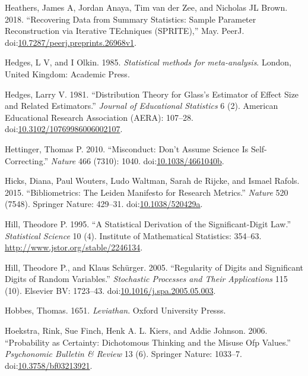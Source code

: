 \documentclass[a5paper]{book}
\begin{document}
\hypertarget{ref-doi:10.7287ux2fpeerj.preprints.26968v1}{}
Heathers, James A, Jordan Anaya, Tim van der Zee, and Nicholas JL Brown.
2018. ``Recovering Data from Summary Statistics: Sample Parameter
Reconstruction via Iterative TEchniques (SPRITE),'' May. PeerJ.
doi:\href{https://doi.org/10.7287/peerj.preprints.26968v1}{10.7287/peerj.preprints.26968v1}.

\hypertarget{ref-Hedges1985-dy}{}
Hedges, L V, and I Olkin. 1985. \emph{Statistical methods for
meta-analysis}. London, United Kingdom: Academic Press.

\hypertarget{ref-doi:10.3102ux2f10769986006002107}{}
Hedges, Larry V. 1981. ``Distribution Theory for Glass's Estimator of
Effect Size and Related Estimators.'' \emph{Journal of Educational
Statistics} 6 (2). American Educational Research Association (AERA):
107--28.
doi:\href{https://doi.org/10.3102/10769986006002107}{10.3102/10769986006002107}.

\hypertarget{ref-doi:10.1038ux2f4661040b}{}
Hettinger, Thomas P. 2010. ``Misconduct: Don't Assume Science Is
Self-Correcting.'' \emph{Nature} 466 (7310): 1040.
doi:\href{https://doi.org/10.1038/4661040b}{10.1038/4661040b}.

\hypertarget{ref-doi:10.1038ux2f520429a}{}
Hicks, Diana, Paul Wouters, Ludo Waltman, Sarah de Rijcke, and Ismael
Rafols. 2015. ``Bibliometrics: The Leiden Manifesto for Research
Metrics.'' \emph{Nature} 520 (7548). Springer Nature: 429--31.
doi:\href{https://doi.org/10.1038/520429a}{10.1038/520429a}.

\hypertarget{ref-doi:10.2307ux2f2246134}{}
Hill, Theodore P. 1995. ``A Statistical Derivation of the
Significant-Digit Law.'' \emph{Statistical Science} 10 (4). Institute of
Mathematical Statistics: 354--63.
\url{http://www.jstor.org/stable/2246134}.

\hypertarget{ref-doi:10.1016ux2fj.spa.2005.05.003}{}
Hill, Theodore P., and Klaus Schürger. 2005. ``Regularity of Digits and
Significant Digits of Random Variables.'' \emph{Stochastic Processes and
Their Applications} 115 (10). Elsevier BV: 1723--43.
doi:\href{https://doi.org/10.1016/j.spa.2005.05.003}{10.1016/j.spa.2005.05.003}.

\hypertarget{ref-leviathan}{}
Hobbes, Thomas. 1651. \emph{Leviathan}. Oxford University Presss.

\hypertarget{ref-doi:10.3758ux2fbf03213921}{}
Hoekstra, Rink, Sue Finch, Henk A. L. Kiers, and Addie Johnson. 2006.
``Probability as Certainty: Dichotomous Thinking and the Misuse Ofp
Values.'' \emph{Psychonomic Bulletin \& Review} 13 (6). Springer Nature:
1033--7.
doi:\href{https://doi.org/10.3758/bf03213921}{10.3758/bf03213921}.
\end{document}
